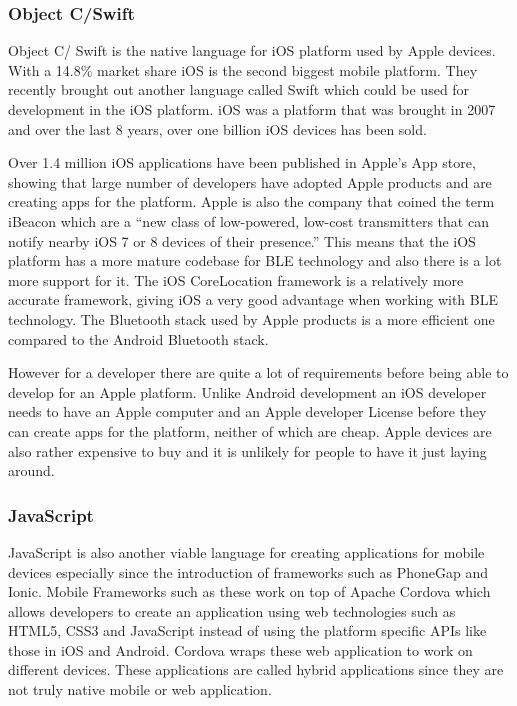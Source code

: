 \subsubsection{Object C/Swift}

Object C/ Swift is the native language for iOS platform used by Apple
devices. With a 14.8\% market share iOS is the second biggest mobile
platform\cite{market-share}. They recently brought out
another language called Swift which could be used for development in the iOS platform. iOS was a platform
that was brought in 2007 and over the last 8 years, over one billion
iOS devices has been sold\cite{oneBios}.

Over 1.4 million iOS applications have been published in Apple's App
store, showing that large number of developers have adopted Apple products
and are creating apps for the platform. Apple is also the company
that coined the term iBeacon which are a ``new class of low-powered,
low-cost transmitters that can notify nearby iOS 7 or 8 devices of
their presence.'' This means that the iOS platform has a more mature
codebase for BLE technology and also there is a lot more support
for it. The iOS CoreLocation\cite{corelocation} framework is a relatively
more accurate framework, giving iOS a very good advantage when working
with BLE technology. The Bluetooth stack used by Apple products is
a more efficient one compared to the Android Bluetooth stack.

However for a developer there are quite a lot of requirements before being
able to develop for an Apple platform. Unlike Android development
an iOS developer needs to have an Apple computer and an Apple developer
License before they can create apps for the platform, neither of which
are cheap. Apple devices are also rather expensive to buy and it is unlikely for people to have it just laying around.


\subsubsection{JavaScript}

JavaScript is also another viable language for creating applications
for mobile devices especially since the introduction of frameworks
such as PhoneGap\cite{phonegap} and Ionic\cite{ionic}. Mobile Frameworks
such as these work on top of Apache Cordova which allows developers to
create an application using web technologies such as HTML5, CSS3 and
JavaScript instead of using the platform specific APIs like those
in iOS and Android. Cordova wraps these web application to work on
different devices. These applications are called hybrid applications
since they are not truly native mobile or web application.

